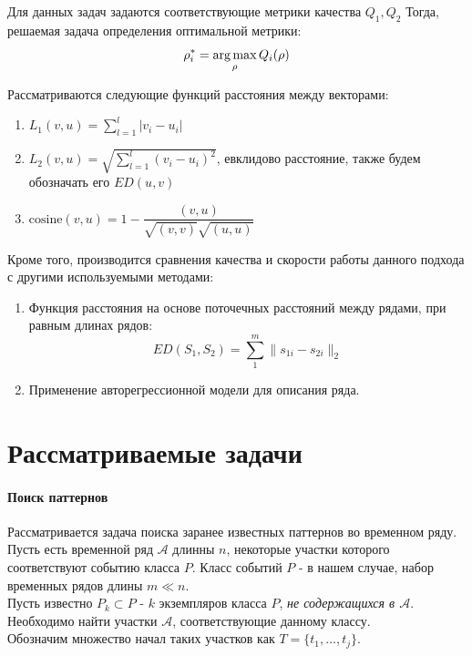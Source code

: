 \documentclass[12pt,twoside]{article}
\begin{document}
        Для данных задач задаются соответствующие метрики качества $Q_1, Q_2$
        Тогда, решаемая задача определения оптимальной метрики:
        $$
            \rho_i^* = \argmax_\rho Q_i(\rho)
        $$

        Рассматриваются следующие функций расстояния между векторами:         
        \begin{enumerate}[label=\arabic*)]
            \item $L_1(v, u) = {\displaystyle\sum_{l = 1}^{l} |v_i - u_i|}$
            \item $L_2(v, u) = \sqrt{\displaystyle\sum_{l = 1}^{l} (v_i - u_i)^2}$,
                евклидово расстояние, также будем обозначать его $ED(u, v)$
            \item $\text{cosine}(v, u) = 1 - \dfrac{(v, u)}{\sqrt{(v, v)}\sqrt{(u, u)}}$
        \end{enumerate}

        Кроме того, производится сравнения качества и скорости работы данного подхода с другими используемыми методами:
        \begin{enumerate}[label=\arabic*)]
            \item Функция расстояния на основе поточечных расстояний между рядами, при равным длинах рядов:
                $$
                    ED(S_1, S_2) = \sum\limits_1^m \|s_{1i} - s_{2i}\|_2
                $$

            \item Применение авторегрессионной модели для описания ряда.
        \end{enumerate}
    
    \section{Рассматриваемые задачи}\label{tasks}
        \paragraph{Поиск паттернов}
        
        Рассматривается задача поиска заранее известных паттернов во временном ряду. 
        Пусть есть временной ряд $\mathcal{A}$ длинны $n$, некоторые участки которого соответствуют событию класса $P$.
        Класс событий $P$ \-- в нашем случае, набор временных рядов длины $m \ll n$. \\
        Пусть известно $P_k \subset P$ \-- $k$ экземпляров класса $P$, \textit{не содержащихся в $\mathcal{A}$}. \\
        Необходимо найти участки $\mathcal{A}$, соответствующие данному классу. \\
        Обозначим множество начал таких участков как $T = \{t_1, \dots, t_j \}$.
\end{document}

